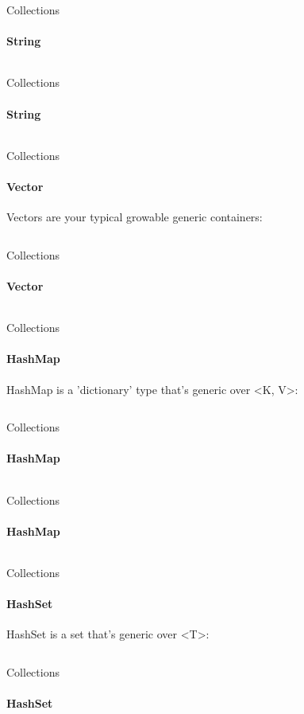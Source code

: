 \documentclass[usenames,dvipsnames,10pt,aspectratio=169]{beamer}
\begin{document}
\begin{frame}{Collections}
	\framesubtitle{String}
	\large
	\inputminted[fontsize=\large]{rust}{code/string2.rs}
	\vspace{0.3cm}
\end{frame}

\begin{frame}{Collections}
	\framesubtitle{String}
	\large
	\inputminted[fontsize=\large]{rust}{code/string3.rs}
	\vspace{0.3cm}
\end{frame}

\begin{frame}{Collections}
	\framesubtitle{Vector}
	\large
	Vectors are your typical growable generic containers:
	\vspace{0.3cm}
	\inputminted[fontsize=\large]{rust}{code/vector.rs}
\end{frame}

\begin{frame}{Collections}
	\framesubtitle{Vector}
	\large
	\inputminted[fontsize=\normalsize]{rust}{code/vector1.rs}
	\vspace{0.3cm}
\end{frame}

\begin{frame}{Collections}
	\framesubtitle{HashMap}
	\large
	HashMap is a 'dictionary' type that's generic over <K, V>:
	\vspace{0.2cm}
	\inputminted[fontsize=\normalsize]{rust}{code/hashmap.rs}
\end{frame}

\begin{frame}{Collections}
	\framesubtitle{HashMap}
	\large
	\inputminted[fontsize=\large]{rust}{code/hashmap1.rs}
	\vspace{0.3cm}
\end{frame}

\begin{frame}{Collections}
	\framesubtitle{HashMap}
	\large
	\inputminted[fontsize=\Large]{rust}{code/hashmap2.rs}
	\vspace{0.3cm}
\end{frame}

\begin{frame}{Collections}
	\framesubtitle{HashSet}
	\large
	HashSet is a set that's generic over <T>:
	\vspace{0.2cm}
	\inputminted[fontsize=\normalsize]{rust}{code/hashset.rs}
\end{frame}

\begin{frame}{Collections}
	\framesubtitle{HashSet}
	\large
	\inputminted[fontsize=\large]{rust}{code/hashset1.rs}
\end{frame}
\end{document}
